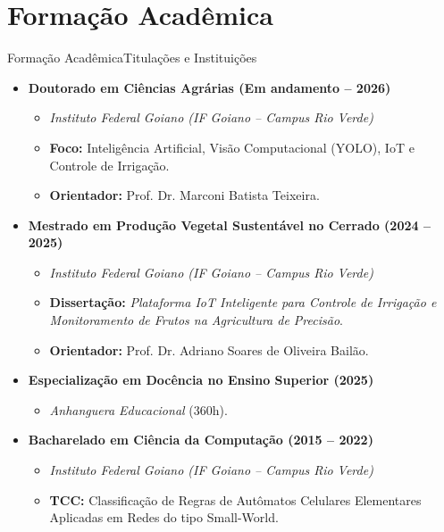 \documentclass[9pt]{beamer}
\begin{document}
\section{Formação Acadêmica}
\begin{frame}{Formação Acadêmica}{Titulações e Instituições}
  \begin{itemize}
    \item \textbf{Doutorado em Ciências Agrárias (Em andamento -- 2026)}
    \begin{itemize}
      \item \textit{Instituto Federal Goiano (IF Goiano -- Campus Rio Verde)}
      \item \textbf{Foco:} Inteligência Artificial, Visão Computacional (YOLO), IoT e Controle de Irrigação.
      \item \textbf{Orientador:} Prof. Dr. Marconi Batista Teixeira.
    \end{itemize}
    
    \vspace{0.15cm}
    \item \textbf{Mestrado em Produção Vegetal Sustentável no Cerrado (2024 -- 2025)}
    \begin{itemize}
      \item \textit{Instituto Federal Goiano (IF Goiano -- Campus Rio Verde)}
      \item \textbf{Dissertação:} \textit{Plataforma IoT Inteligente para Controle de Irrigação e Monitoramento de Frutos na Agricultura de Precisão}.
      \item \textbf{Orientador:} Prof. Dr. Adriano Soares de Oliveira Bailão.
    \end{itemize}

    \vspace{0.15cm}
    \item \textbf{Especialização em Docência no Ensino Superior (2025)}
    \begin{itemize}
      \item \textit{Anhanguera Educacional} (360h).
    \end{itemize}

    \vspace{0.15cm}
    \item \textbf{Bacharelado em Ciência da Computação (2015 -- 2022)}
    \begin{itemize}
      \item \textit{Instituto Federal Goiano (IF Goiano -- Campus Rio Verde)}
      \item \textbf{TCC:} Classificação de Regras de Autômatos Celulares Elementares Aplicadas em Redes do tipo Small-World.
    \end{itemize}
  \end{itemize}
\end{frame}
\end{document}
